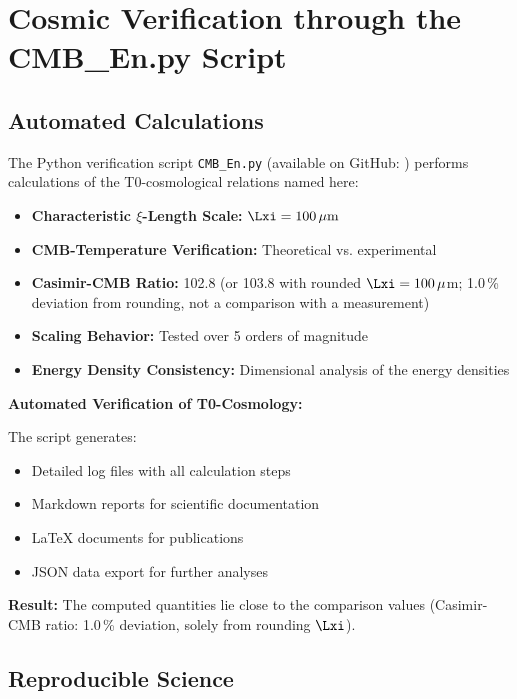 	\section{Cosmic Verification through the CMB\_En.py Script}
	
	\subsection{Automated Calculations}
	
	The Python verification script \texttt{CMB\_En.py} (available on GitHub: ) performs calculations of the T0-cosmological relations named here:
	
	\begin{itemize}
		\item \textbf{Characteristic $\xi$-Length Scale:} $\Lxi = 100\,\mu\text{m}$
		\item \textbf{CMB-Temperature Verification:} Theoretical vs. experimental
		\item \textbf{Casimir-CMB Ratio:} 102.8 (or 103.8 with rounded $\Lxi = 100\,\mu$m; 1.0\,\% deviation from rounding, not a comparison with a measurement)
		\item \textbf{Scaling Behavior:} Tested over 5 orders of magnitude
		\item \textbf{Energy Density Consistency:} Dimensional analysis of the energy densities
	\end{itemize}
	
	\begin{experiment}
		\textbf{Automated Verification of T0-Cosmology:}
		
		The script generates:
		\begin{itemize}
			\item Detailed log files with all calculation steps
			\item Markdown reports for scientific documentation
			\item LaTeX documents for publications
			\item JSON data export for further analyses
		\end{itemize}
		
		\textbf{Result:} The computed quantities lie close to the comparison values (Casimir-CMB ratio: 1.0\,\% deviation, solely from rounding $\Lxi$).
	\end{experiment}
	
	\subsection{Reproducible Science}
	
